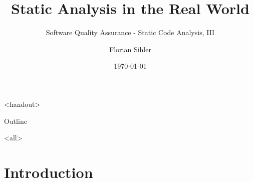 \documentclass[
   aspectratio=169, %
   10pt, %
   uniqueslidenumber,
   professionalfonts
]{beamer}
\title{Static Analysis in the Real World}
\subtitle[SQA]{Software Quality Assurance - Static Code Analysis, III}
\author[F. Sihler]{Florian Sihler}
\date{\today} %
\begin{document}

\mode
<handout>

\begin{frame}{\strut Outline}
\tableofcontents[hideallsubsections]
\end{frame}

\mode
<all>

\section{Introduction}
\end{document}
